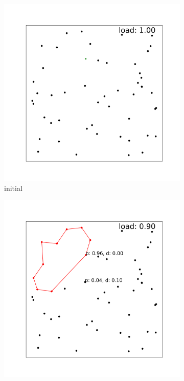 \documentclass{article}
\begin{document}
\begin{figure}
    \begin{subfigure}[]{0.32\linewidth}
        \includegraphics[width=\linewidth]{figures/50-0-am.png}
        \caption{initial}
        \label{fig:cvrp-50-initial}
    \end{subfigure}
    \begin{subfigure}[]{0.32\linewidth}
        \includegraphics[width=\linewidth]{figures/50-11-am.png}

\end{subfigure}
\end{figure}
\end{document}
